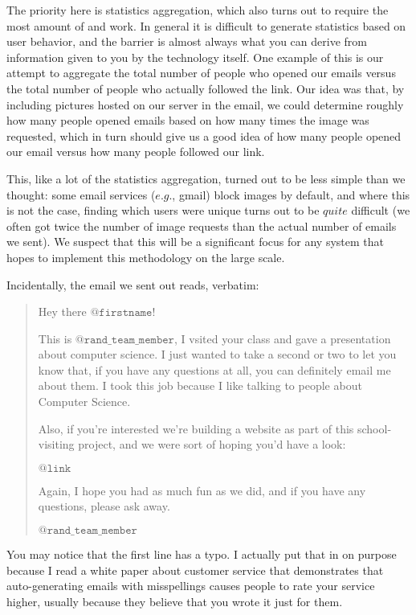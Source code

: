 \documentclass[11pt,a4paper]{article}
\begin{document}
The priority here is statistics aggregation, which also turns out to require the most amount of and work. In general it is difficult to generate statistics based on user behavior, and the barrier is almost always what you can derive from information given to you by the technology itself. One example of this is our attempt to aggregate the total number of people who opened our emails versus the total number of people who actually followed the link. Our idea was that, by including pictures hosted on our server in the email, we could determine roughly how many people opened emails based on how many times the image was requested, which in turn should give us a good idea of how many people opened our email versus how many people followed our link.

This, like a lot of the statistics aggregation, turned out to be less simple than we thought: some email services ($\textit{e.g.}$, gmail) block images by default, and where this is not the case, finding which users were unique turns out to be $\textit{quite}$ difficult (we often got twice the number of image requests than the actual number of emails we sent). We suspect that this will be a significant focus for any system that hopes to implement this methodology on the large scale.

Incidentally, the email we sent out reads, verbatim:
	
	\begin{quote}
	Hey there $\texttt{@firstname}$!
	
	This is $\texttt{@rand\_team\_member}$, I vsited your class and gave a presentation about computer science. I just wanted to take a second or two to let you know that, if you have any questions at all, you can definitely email me about them. I took this job because I like talking to people about Computer Science.
	
	Also, if you're interested we're building a website as part of this school-visiting project, and we were sort of hoping you'd have a look:
	
	$\texttt{@link}$
	
	Again, I hope you had as much fun as we did, and if you have any questions, please ask away.
	
	$\texttt{@rand\_team\_member}$
	\end{quote}

You may notice that the first line has a typo. I actually put that in on purpose because I read a white paper about customer service that demonstrates that auto-generating emails with misspellings causes people to rate your service higher, usually because they believe that you wrote it just for them.
\end{document}
